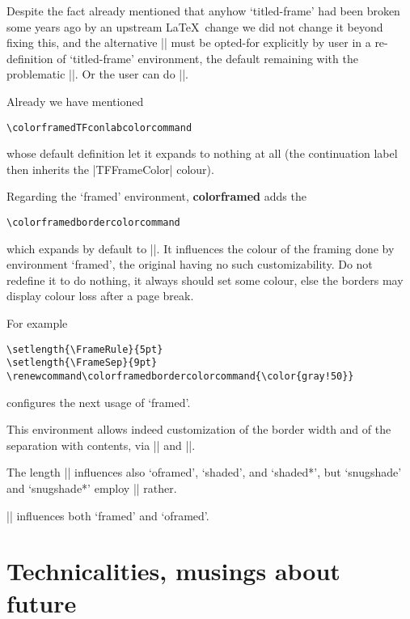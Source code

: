\documentclass[a4paper,dvipdfmx,10pt,english]{article}
\def\colorframedTFconlabcolorcommand{\color{purple}}
\def\colorframedbordercolorcommand{\color{red!20}}
\newcommand\colorframed{%
        \texorpdfstring{{\color{joli}\bfseries colorframed}}{colorframed}\xspace}
\begin{document}
\begin{footnotesize}
  Despite the fact already
  mentioned that anyhow `titled-frame' had been broken some years ago by an
  upstream \LaTeX\ change we did not change it beyond
  fixing this, and the alternative || must be
  opted-for explicitly by user in a re-definition of `titled-frame'
  environment, the default remaining with the problematic
  |\TitleBarFrame|. Or the user can do |\let\TitleBarFrame\colorframedTitleBarFrame|.
  \par
\end{footnotesize}

Already we have mentioned
\begin{verbatim}
\colorframedTFconlabcolorcommand
\end{verbatim}
whose default definition let it expands to nothing at all (the continuation label
then inherits the |TFFrameColor| colour).

Regarding the `framed' environment, \colorframed adds the
\begin{verbatim}
\colorframedbordercolorcommand
\end{verbatim}
which expands by default to |\normalcolor|.  It influences the colour of the
framing done by environment `framed', the original having no such
customizability.  Do not redefine it to do nothing, it always should set some
colour, else the borders may display colour loss after a page break.

For example
\begin{verbatim}
\setlength{\FrameRule}{5pt}
\setlength{\FrameSep}{9pt}
\renewcommand\colorframedbordercolorcommand{\color{gray!50}}
\end{verbatim}
configures the next usage of `framed'.

\setlength{\FrameRule}{5pt}
\setlength{\FrameSep}{9pt}
\renewcommand\colorframedbordercolorcommand{\color{gray!50}}
\begin{framed}
  This environment allows indeed customization of the border width
  and of the separation with contents, via |\FrameRule| and
  |\FrameSep|.

  The length |\FrameSep| influences also `oframed', `shaded', and `shaded*',
  but `snugshade' and `snugshade*' employ |\fboxsep| rather.

  |\FrameRule| influences both `framed' and `oframed'.
\end{framed}

\section{Technicalities, musings about future}
\end{document}
